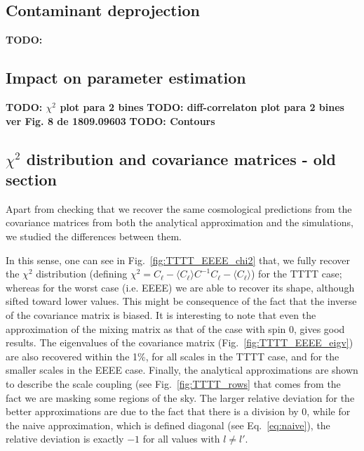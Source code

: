 \documentclass[a4paper,11pt]{article}
\newcommand{\todo}[1]{{\bf TODO: #1}}
\newcommand{\cl}{C_\ell}
\begin{document}
\subsection{Contaminant deprojection}
\todo{}

\subsection{Impact on parameter estimation}
\todo{$\chi^2$ plot para 2 bines}
\todo{diff-correlaton plot para 2 bines ver Fig. 8  de 1809.09603}
\todo{Contours}

\subsection{$\chi^2$ distribution and covariance matrices - old section}
Apart from checking that we recover the same cosmological predictions from the
covariance matrices from both the analytical approximation and the
simulations, we studied the differences between them.

In this sense, one can see in Fig.~\ref{fig:TTTT_EEEE_chi2} that, we fully
recover the $\chi^2$ distribution (defining $\chi^2 = \cl - \langle \cl
\rangle C^{-1} \cl - \langle \cl \rangle$) for the TTTT case; whereas for the
worst case (i.e. EEEE) we are able to recover its shape, although sifted
toward lower values. This might be consequence of the fact that the inverse of
the covariance matrix is biased. It is interesting to note that even
the approximation of the mixing matrix as that of the case with spin 0, gives
good results. The eigenvalues of the covariance matrix
(Fig.~\ref{fig:TTTT_EEEE_eigv}) are also recovered within the 1\%, for all
scales in the TTTT case, and for the smaller scales in the EEEE case. Finally,
the analytical approximations are shown to describe the scale coupling (see
Fig.~\ref{fig:TTTT_rows} that comes from the fact we are masking some regions
of the sky. The larger relative deviation for the better approximations are
due to the fact that there is a division by $0$, while for the naive
approximation, which is defined diagonal (see Eq.~\ref{eq:naive}), the
relative deviation is exactly $-1$ for all values with $l \neq l'$.
\end{document}
